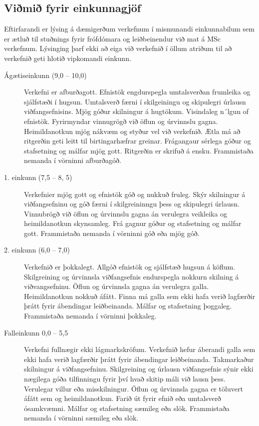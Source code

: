 \subsection{Viðmið fyrir einkunnagjöf}
Eftirfarandi er lýsing á dæmigerðum verkefnum í mismunandi einkunnabilum sem er ætluð til stuðnings fyrir frófdómara og leiðbeinendur við mat á MSc verkefnum.
Lýsinging þarf ekki að eiga við verkefnið í öllum atriðum til að verkefnið geti hlotið vipkomandi einkunn.

\begin{description}
\item[Ágætiseinkunn (9,0 -- 10,0)] Verkefni er afburðagott.
  Efnistök engdurspegla umtalsverðan frumleika og sjálfstæði í hugsun.
  Umtalsverð færni í skilgeiningu og skipulegri úrlausn viðfangsefnisins.
  Mjög góður skilningur á hugtökum.
  Visindaleg n´lgun of efnistök.
  Fyrirmyndar vinnugrögð við öflun og úrvinnslu gagna.
  Heimildanotkun mjög nákvæm og styður vel við verkefnið.
  Ætla má að ritgerðin geti leitt til birtingarhæfrar greinar.
  Frágangaur sérlega góður og stafsetning og málfar mjög gott.
  Ritgerðin er skrifuð á ensku.
  Frammistaða nemanda í vörninni afburðagóð.
\item[1. einkunn (7,5 -- 8, 5)] Verkefnier mjög gott og efnistök góð og nukkuð fruleg.
  Skýr skilningur á viðfangsefninu og góð færni í skilgreininngu þess og skipulegri úrlausn.
  Vinnubrögð við öflun og úrvinnslu gagna án verulegra veikleika og heimildanotkun skynsamleg.
  Frá gagnur góður og stafsetning og málfar gott.
  Frammistaða nemanda í vörninni góð eða mjög góð.
\item[2. einkunn (6,0 -- 7,0)]  Verkefnið er þokkalegt.
  Allgóð efnistök og sjálfstæð hugsun á köflum.
  Skilgreining og úrvinnsla viðfangsefnis endurspegla nokkurn skilning á viðvangsefninu.
  Öflun og úrvinnsla gagna án verulegra galla.
  Heimildanotkun nokkuð áfátt.
  Finna má galla sem ekki hafa verið lagfærðir þrátt fyrir ábendingar leiðbeinanda.
  Málfar og stafsetning þoggaleg.
  Frammistaða nemanda í vörninni þokkaleg.
\item[Falleinkunn 0,0 -- 5,5]  Verkefni fullnægir ekki lágmarkskröfum.
  Verkefnið hefur áberandi galla sem ekki hafa verið lagfærðir þrátt fyrir ábendingar leiðbeinanda.
  Takmarkaður skilningur á viðfangsefninu.
  Skilgreining og úrlausn viðfangsefnis sýnir ekki nægilega góða tilfinningu fyrir því hvað skitip máli við lausn þess.
  Verulegar villur eða misskilningur.
  Öflun og úrvinnsla gagna er töluvert áfátt sem og heimildanotkun.
  Farið út fyrir efnið eða umtalsverð ósamkvæmni.
  Málfar og stafsetning sæmileg eða slök.
  Frammistaða nemanda í vörninni sæmileg eða slök.
\end{description}

